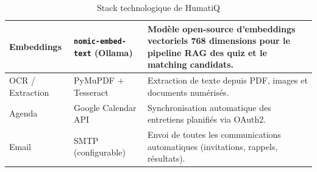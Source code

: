\begin{table}[H]
{\begin{tabular}{|l|l|p{8cm}|}
\hline
Embeddings & \texttt{nomic-embed-text} (Ollama) & Modèle open-source d'embeddings vectoriels 768 dimensions pour le pipeline RAG des quiz et le matching candidats. \\
\hline
OCR / Extraction & PyMuPDF + Tesseract & Extraction de texte depuis PDF, images et documents numérisés. \\
\hline
Agenda & Google Calendar API & Synchronisation automatique des entretiens planifiés via OAuth2. \\
\hline
Email & SMTP (configurable) & Envoi de toutes les communications automatiques (invitations, rappels, résultats). \\
\hline
\end{tabular}%
}
\caption{Stack technologique de HumatiQ}
\label{tab:stack}
\end{table}
